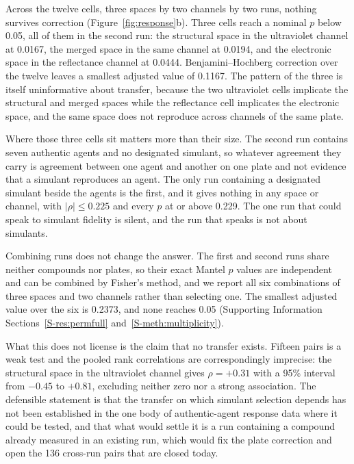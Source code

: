\documentclass[journal=jacsat,manuscript=article,margin=1in]{achemso}
\begin{document}
Across the twelve cells, three spaces by two channels by two runs, nothing
survives correction (Figure~\ref{fig:response}b). Three cells reach a
nominal $p$ below 0.05, all of them in the second run: the structural space
in the ultraviolet channel at 0.0167, the merged space in the same channel
at 0.0194, and the electronic space in the reflectance channel at 0.0444.
Benjamini--Hochberg correction over the twelve leaves a smallest adjusted
value of 0.1167. The pattern of the three is itself uninformative about
transfer, because the two ultraviolet cells implicate the structural and
merged spaces while the reflectance cell implicates the electronic space,
and the same space does not reproduce across channels of the same plate.

Where those three cells sit matters more than their size. The second run
contains seven authentic agents and no designated simulant, so whatever
agreement they carry is agreement between one agent and another on one plate
and not evidence that a simulant reproduces an agent. The only run containing
a designated simulant beside the agents is the first, and it gives nothing in
any space or channel, with $|\rho| \le 0.225$ and every $p$ at or above 0.229.
The one run that could speak to simulant fidelity is silent, and the run that
speaks is not about simulants.

Combining runs does not change the answer. The first and second runs share
neither compounds nor plates, so their exact Mantel $p$ values are independent
and can be combined by Fisher's method, and we report all six combinations of
three spaces and two channels rather than selecting one. The smallest adjusted
value over the six is 0.2373, and none reaches 0.05 (Supporting Information
Sections~\ref{S-res:permfull} and~\ref{S-meth:multiplicity}).

What this does not license is the claim that no transfer exists. Fifteen pairs
is a weak test and the pooled rank correlations are correspondingly imprecise:
the structural space in the ultraviolet channel gives $\rho=+0.31$ with a 95\%
interval from $-0.45$ to $+0.81$, excluding neither zero nor a strong
association. The defensible statement is that the transfer on which simulant
selection depends has not been established in the one body of authentic-agent
response data where it could be tested, and that what would settle it is a run
containing a compound already measured in an existing run, which would fix the
plate correction and open the 136 cross-run pairs that are closed today.
\end{document}
